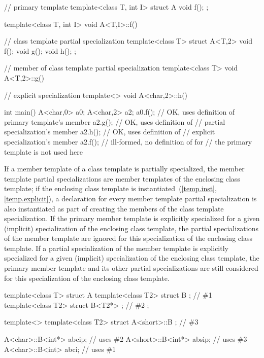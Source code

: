 \begin{codeblock}
// primary template
template<class T, int I> struct A {
  void f();
};

template<class T, int I> void A<T,I>::f() { }

// class template partial specialization
template<class T> struct A<T,2> {
  void f();
  void g();
  void h();
};

// member of class template partial specialization
template<class T> void A<T,2>::g() { }

// explicit specialization
template<> void A<char,2>::h() { }

int main() {
  A<char,0> a0;
  A<char,2> a2;
  a0.f();                       // OK, uses definition of primary template's member
  a2.g();                       // OK, uses definition of
                                // partial specialization's member
  a2.h();                       // OK, uses definition of
                                // explicit specialization's member
  a2.f();                       // ill-formed, no definition of  for 
                                // the primary template is not used here
}
\end{codeblock}
\exitexample

\pnum
If a member template of a class template is partially specialized,
the member template partial specializations are member templates of
the enclosing class template;
if the enclosing class template is instantiated~(\ref{temp.inst}, \ref{temp.explicit}),
a declaration for every member template partial specialization is also
instantiated as part of creating the members of the class template
specialization.
If the primary member template is explicitly specialized for a given
(implicit) specialization of the enclosing class template,
the partial specializations of the member template are ignored for this
specialization of the enclosing class template.
If a partial specialization of the member template is explicitly specialized
for a given (implicit) specialization of the enclosing class template,
the primary member template and its other partial specializations are
still considered for this specialization of the enclosing class template.
\enterexample

\begin{codeblock}
template<class T> struct A {
  template<class T2> struct B {};                     // \#1
  template<class T2> struct B<T2*> {};                // \#2
};

template<> template<class T2> struct A<short>::B {};  // \#3

A<char>::B<int*>  abcip;  // uses \#2
A<short>::B<int*> absip;  // uses \#3
A<char>::B<int>  abci;    // uses \#1
\end{codeblock}
\exitexample

